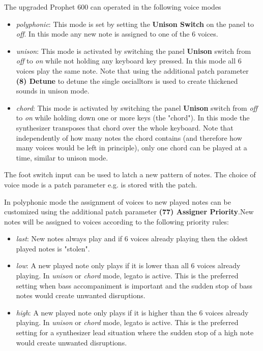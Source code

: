 The upgraded Prophet 600 can operated in the following voice modes

\begin{itemize}
  \setlength\itemsep{0cm}
  \item \textit{polyphonic}: This mode is set by setting the \textbf{Unison Switch} on the panel to \textit{off}. In this mode any new note is assigned to one of the 6 voices. 
  \item \textit{unison}: This mode is activated by switching the panel \textbf{Unison} switch from \textit{off} to \textit{on} while not holding any keyboard key pressed. In this mode all 6 voices play the same note. Note that using the additional patch parameter \textbf{(8) Detune} to detune the single oscialltors is used to create thickened sounds in unison mode.
  \item \textit{chord}: This mode is activated by switching the panel \textbf{Unison} switch from \textit{off} to \textit{on} while holding down one or more keys (the "chord"). In this mode the synthesizer transposes that chord over the whole keyboard. Note that independently of how many notes the chord contains (and therefore how many voices would be left in principle), only one chord can be played at a time, similar to unison mode.
\end{itemize} 

The foot switch input can be used to latch a new pattern of notes. The choice of voice mode is a patch parameter e.g. is stored with the patch.

In polyphonic mode the assignment of voices to new played notes can be customized using the additional patch parameter \textbf{(77) Assigner Priority}.New notes will be assigned to voices according to the following priority rules:

\begin{itemize}
  \setlength\itemsep{0cm}
  \item \textit{last}: New notes always play and if 6 voices already playing then the oldest played notes is "stolen".
  \item \textit{low}: A new played note only plays if it is lower than all 6 voices already playing. In \textit{unison} or \textit{chord} mode, legato is active. This is the preferred setting when bass accompaniment is important and the sudden stop of bass notes would create unwanted disruptions. 
  \item \textit{high}: A new played note only plays if it is higher than the 6 voices already playing. In \textit{unison} or \textit{chord} mode, legato is active. This is the preferred setting for a synthesizer lead situation where the sudden stop of a high note would create unwanted disruptions. 
\end{itemize}

